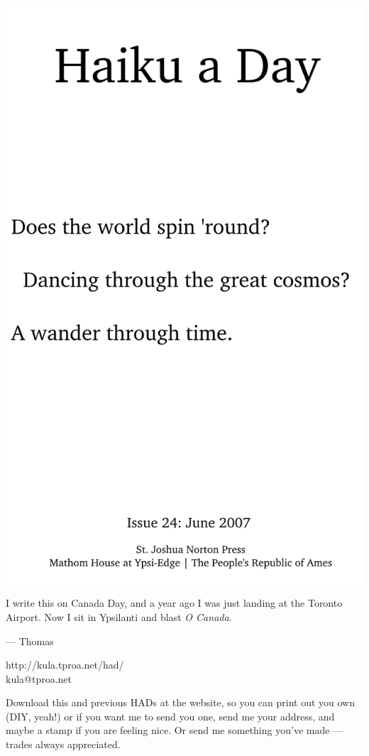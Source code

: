 \documentclass[12pt]{article}
\begin{document}
\includegraphics{frontpage.png}

\newpage

I write this on Canada Day, and a year ago I was just landing
at the Toronto Airport. Now I sit in Ypsilanti and blast
{\em O Canada}.


--- Thomas

http://kula.tproa.net/had/ \\
kula@tproa.net

Download this and previous HADs at the website, so you can
print out you own (DIY, yeah!) or if you want me to send
you one, send me your address, and maybe a stamp if you
are feeling nice. Or send me something you've made ---
trades always appreciated.
\end{document}
